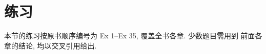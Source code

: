 \chapter*{练习}

{\setlength{\emergencystretch}{2em}%
本节的练习按原书顺序编号为 Ex 1--Ex 35, 覆盖全书各章. 少数题目需用到
前面各章的结论, 均以交叉引用给出.\par}

